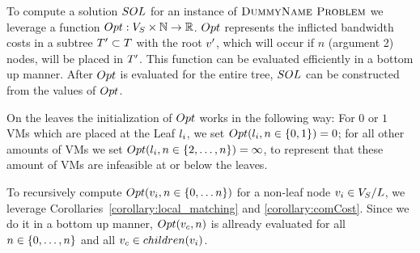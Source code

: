 To compute a solution $SOL$ for an instance of $\textsc{DummyName Problem}$ we leverage a
function $Opt : V_S \times \mathbb{N} \rightarrow \mathbb{R}$. 
$Opt$ represents the inflicted bandwidth costs in a subtree $T' \subset 
T$ with the root $v'$, which will occur if $n$ (argument 2) 
nodes, will be placed in $T'$.
This 
function can be evaluated 
efficiently in a bottom up manner. After $Opt$ is evaluated for the entire 
tree, $SOL$ can be constructed from the values of $Opt$.

On the leaves the initialization of $Opt$ 
works in the following way: For $0$ or 
$1$ VMs which are placed at the Leaf $l_i$, we set $Opt(l_i, n \in 
\{0,1\}) = 0$; for all other amounts of VMs we set $Opt(l_i, n \in 
\{2,\dots,n\}) = \infty$, to represent that these amount of VMs are 
infeasible at or below the leaves.

To recursively compute $Opt(v_i, n \in \{0,\dots n\})$ for a 
non-leaf node $v_i \in V_S / L$, we leverage 
Corollaries~\ref{corollary:local_matching} and \ref{corollary:comCost}. Since 
we do it in a bottom up manner, $Opt(v_c, n)$ 
is allready evaluated for all $n \in \{0,\dots,n\}$ and all 
$v_c \in children(v_i)$.

